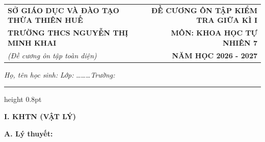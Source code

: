 \documentclass[11pt,a4paper]{article}
\begin{document}
\begin{tabularx}{\textwidth}{@{}l X r@{}}
\textbf{\small SỞ GIÁO DỤC VÀ ĐÀO TẠO THỪA THIÊN HUẾ} & & \textbf{\small ĐỀ CƯƠNG ÔN TẬP KIỂM TRA GIỮA KÌ I} \\
\textbf{\normalsize TRƯỜNG THCS NGUYỄN THỊ MINH KHAI} & & \textbf{\normalsize MÔN: KHOA HỌC TỰ NHIÊN 7} \\
\textit{\small (Đề cương ôn tập toàn diện)} & & \textbf{\small NĂM HỌC 2026 - 2027}
\end{tabularx}

\begin{center}

\textit{Họ, tên học sinh:} \dotfill \quad \textit{Lớp:} \dots\dots\dots \quad \textit{Trường:} \dotfill
\end{center}
\vspace{-4pt}
{\color{gray!50}\hrule height 0.8pt}
\vspace{8pt}

{\color{myGreen}\large\bfseries I. KHTN (VẬT LÝ)}

\vspace{3pt}
{\color{mySub}\textbf{A. Lý thuyết:}}
\end{document}
